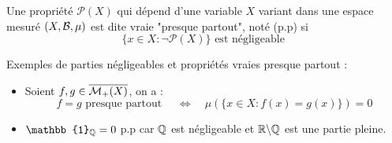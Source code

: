 \begin{definition}
    Une propriété $\mathcal{P}(X)$ qui dépend d'une variable $X$ variant dans une espace mesuré $(X,\mathcal{B},\mu)$ est dite vraie "presque partout", noté (p.p) si 
        \[ \{ x \in X : \lnot \mathcal{P}(X) \} \text{ est négligeable } \] 
\end{definition}

\begin{example} Exemples de parties négligeables et propriétés vraies presque partout :
    \begin{itemize}
        \item  Soient $f,g \in \overline{\mathcal{M}_+(X)}$, on a :
            \[ f = g \text{ presque partout } \quad \Longleftrightarrow \quad \mu(\{x \in X : f(x) = g(x) \}) = 0 \] 
        \item $\mathbb{1}_\Q = 0$ p.p car $\mathbb{Q}$ est négligeable et $\mathbb{R} \backslash \mathbb{Q}$ est une partie pleine. 
    \end{itemize}
   
\end{example}
